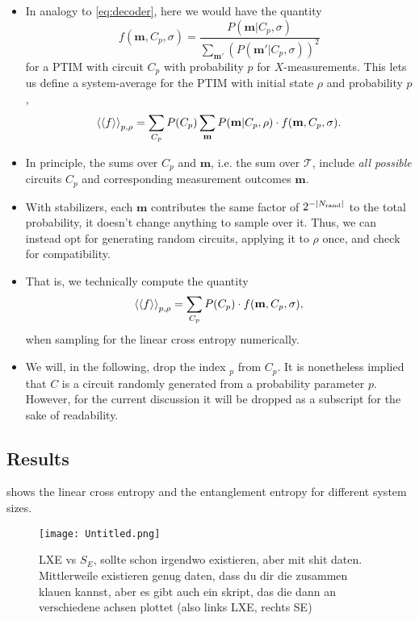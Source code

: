 \begin{itemize}
  \item In analogy to \cref{eq:decoder}, here we would have the quantity
    \[
      f(\mathbf{m}, C_p, \sigma) = \frac{P(\mathbf{m} |
     C_p,\sigma)}{\sum_{\mathbf{m'}}\left(P(\mathbf{m}'|C_p,\sigma)\right)^2}
    \]
    for a PTIM with circuit $C_p$ with probability $p$ for $X$-measurements. This
    lets us define a system-average for the PTIM with initial state $\rho$ and
    probability $p$,
    \begin{align}
      \expval{\expval{f}}_{p,\rho} = \sum_{C_p} P(C_p) \sum_\mathbf{m}
      P(\mathbf{m} |C_p,\rho)\cdot f(\mathbf{m},C_p, \sigma)
    .\end{align}
  \item In principle, the sums over $C_p$ and $\mathbf{m}$, i.e. the sum over
    $\mathcal{T}$, include \emph{all possible} circuits $C_p$ and
    corresponding measurement outcomes $\mathbf{m}$.
  \item With stabilizers, each $\mathbf{m}$ contributes the same factor of
    $2^{-\abs{N_\mathrm{rand}}}$ to the total probability, it doesn't change
    anything to sample over it. Thus, we can instead opt for generating random
    circuits, applying it to $\rho$ once, and check for compatibility. 
  \item That is, we technically compute the quantity
    \begin{align}\label{eq:sample-f-C}
      \expval{\expval{f}}_{p,\rho} = \sum_{C_p} P(C_p)
      \cdot f(\mathbf{m},C_p, \sigma)
    ,\end{align}
    when sampling for the linear cross entropy numerically.
  \item We will, in the following, drop the index $_p$ from $C_p$. It is
    nonetheless implied that $C$ is a circuit randomly generated from a probability
    parameter $p$. However, for the current discussion it will be dropped as a
    subscript for the sake of readability.
\end{itemize}

\subsection{Results}

 shows the linear cross entropy and the
entanglement entropy for different system sizes.
\begin{figure}[h]
  \centering
  \texttt{[image: Untitled.png]}
  \caption{LXE vs $S_E$, sollte schon irgendwo existieren, aber mit shit daten.
  Mittlerweile existieren genug daten, dass du dir die zusammen klauen kannst,
aber es gibt auch ein skript, das die dann an verschiedene achsen plottet (also
links LXE, rechts SE)}
  \label{fig:lxe-vs-se-default}
\end{figure}

